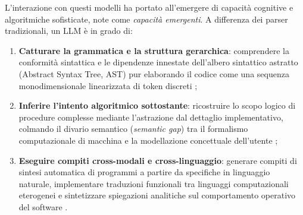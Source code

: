 L'interazione con questi modelli ha portato all'emergere di capacità cognitive e algoritmiche sofisticate, note come \emph{capacità emergenti}. A differenza dei parser tradizionali, un LLM è in grado di:
\begin{enumerate}
    \item \textbf{Catturare la grammatica e la struttura gerarchica}: comprendere la conformità sintattica e le dipendenze innestate dell'albero sintattico astratto (Abstract Syntax Tree, AST) pur elaborando il codice come una sequenza monodimensionale linearizzata di token discreti \cite{zhang_survey_2022};
    \item \textbf{Inferire l'intento algoritmico sottostante}: ricostruire lo scopo logico di procedure complesse mediante l'astrazione dal dettaglio implementativo, colmando il divario semantico (\emph{semantic gap}) tra il formalismo computazionale di macchina e la modellazione concettuale dell'utente \cite{geng_large_2023,rai_review_2022};
    \item \textbf{Eseguire compiti cross-modali e cross-linguaggio}: generare compiti di sintesi automatica di programmi a partire da specifiche in linguaggio naturale, implementare traduzioni funzionali tra linguaggi computazionali eterogenei e sintetizzare spiegazioni analitiche sul comportamento operativo del software \cite{zhang_deep_2024,bairi_codeplan_2023}.
\end{enumerate}

